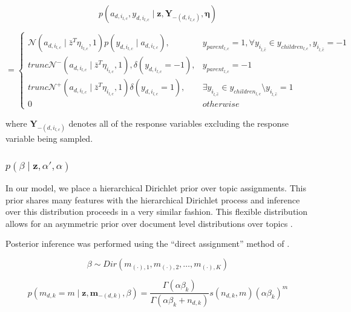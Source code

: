 \documentclass{article}
\begin{document}
\[
p\left(a_{d,i_{l,c}},y_{d,i_{l,c}}\mid\mathbf{z},\mathbf{Y}_{-\left(d,i_{l,c}\right)},\mathbf{\eta}\right)\]


\begin{equation}
=\begin{cases}
\mathcal{N}\left(a_{d,i_{l,c}}\mid\bar{z}^{T}\eta_{i_{l,c}},1\right)p\left(y_{d,i_{l,c}}\mid a_{d,i_{l,c}}\right), & y_{parent_{l,c}}=1,\forall y_{i_{\hat{l},\hat{c}}}\in y_{children_{l,c}},y_{i_{\hat{l},\hat{c}}}=-1\\
trunc\mathcal{N}^{-}\left(a_{d,i_{l,c}}\mid\bar{z}^{T}\eta_{i_{l,c}},1\right),\delta\left(y_{d,i_{l,c}}=-1\right), & y_{parent_{l,c}}=-1\\
trunc\mathcal{N}^{+}\left(a_{d,i_{l,c}}\mid\bar{z}^{T}\eta_{i_{l,c}},1\right)\delta\left(y_{d,i_{l,c}}=1\right), & \exists y_{i_{\hat{l},\hat{c}}}\in y_{children_{l,c}}\setminus y_{i_{\hat{l},\hat{c}}}=1\\
0 & otherwise\end{cases}\end{equation}


where $\mathbf{Y}_{-\left(d,i_{l,c}\right)}$ denotes all of the response
variables excluding the response variable being sampled.


\subsubsection{$p\left(\beta\mid\mathbf{z},\alpha',\alpha\right)$}

In our model, we place a hierarchical Dirichlet prior over topic assignments.
This prior shares many features with the hierarchical Dirichlet process
and inference over this distribution proceeds in a very similar fashion.
This flexible distribution allows for an asymmetric prior over document
level distributions over topics \citet{WallachMiMc2009}.

Posterior inference was performed using the {}``direct assignment''
method of \citet{TehJorBea2006}.

\begin{equation}
\beta\sim Dir\left(m_{\left(\cdot\right),1},m_{\left(\cdot\right),2},\ldots,m_{\left(\cdot\right),K}\right)\end{equation}


\begin{equation}
p\left(m_{d,k}=m\mid\mathbf{z},\mathbf{m}_{-\left(d,k\right)},\beta\right)=\frac{\Gamma\left(\alpha\beta_{k}\right)}{\Gamma\left(\alpha\beta_{k}+n_{d,k}\right)}s\left(n_{d,k},m\right)\left(\alpha\beta_{k}\right)^{m}\end{equation}
\end{document}
